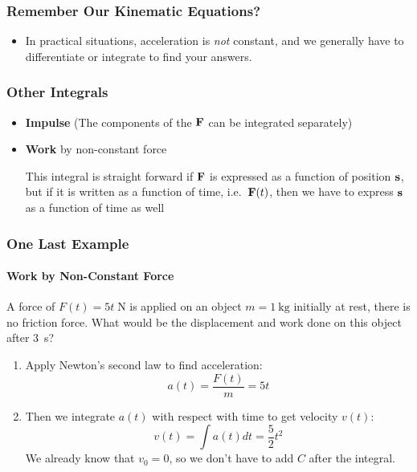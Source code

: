\documentclass[12pt,compress,aspectratio=169]{beamer}
\newcommand{\mb}[1]{\ensuremath\mathbf{#1}}
\begin{document}
\begin{frame}
  \frametitle{Remember Our Kinematic Equations?}
  \begin{itemize}
  \item In practical situations, acceleration is \emph{not} constant, and we
    generally have to differentiate or integrate to find your answers.
  \end{itemize}
\end{frame}

\begin{frame}
  \frametitle{Other Integrals}
  \begin{itemize}
  \item\textbf{Impulse} (The components of the $\mb{F}$ can be integrated
    separately)
    
    \vspace{-0.2in}{\Large
      \begin{displaymath}
        \mb{J}=\int_{t_1}^{t_2}\mb{F}dt
      \end{displaymath}
    }

  \item\textbf{Work} by non-constant force

    \vspace{-0.25in}{\Large
      \begin{displaymath}
        W=\int_{x_1}^{x_2}\mb{F}(x)\cdot d\mb{s}
      \end{displaymath}
    }
    
    \vspace{-0.1in}This integral is straight forward if $\mb{F}$ is expressed
    as a function of position $\mb{s}$, but if it is written as a function of
    time, i.e.\ $\mb{F}(t)$, then we have to express $\mb{s}$ as a function of
    time as well
  \end{itemize}
\end{frame}


\begin{frame}
  \frametitle{One Last Example}
  \framesubtitle{Work by Non-Constant Force}

  A force of $F(t)=5t\;\si{\N}$ is applied on an object $m=\SI{1}{\kg}$ initially
  at rest, there is no friction force. What would be the displacement and work
  done on this object after \SI{3}{\s}?

  \begin{enumerate}
  \item Apply Newton's second law to find acceleration:
    \begin{displaymath}
      a(t)=\frac{F(t)}{m}=5t
    \end{displaymath}
  \item Then we integrate $a(t)$ with respect with time to get velocity $v(t)$:
    \begin{displaymath}
      v(t)=\int a(t)dt=\frac{5}{2}t^2
    \end{displaymath}
    We already know that $v_0=0$, so we don't have to add $C$ after the
    integral.
  \end{enumerate}
\end{frame}
\end{document}
